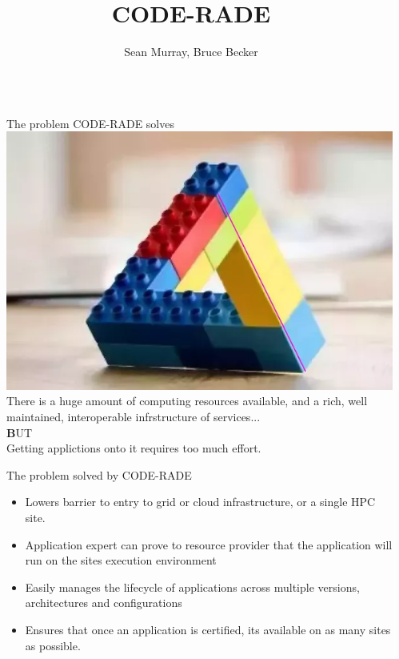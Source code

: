 \documentclass[final]{beamer}
\title{CODE-RADE}
\author{Sean Murray, Bruce Becker}
\institute{CSIR Meraka, University of Cape Town}
\newlength{\sepwid}
\newlength{\onecolwid}
\begin{document}
\begin{frame}[t]
  \begin{columns}[t]												%
    \begin{column}{\sepwid}\end{column}			%
    \begin{column}{\onecolwid}
        \begin{block}{The problem CODE-RADE solves}
             \\
             \center\includegraphics[scale=.5]{img/legoparadox.png}\\
             There is a huge amount of computing resources available, and a rich, well maintained, interoperable infrstructure of services... \\
             \center\textbf BUT \\
             Getting applictions onto it requires too much effort.
        \end{block}         
            \begin{block}{The problem solved by CODE-RADE}
             \begin{itemize}
                 \item Lowers barrier to entry to grid or cloud infrastructure, or a single HPC site.
                 \item Application expert can prove to resource provider that the application will run on the sites execution environment
                 \item Easily manages the lifecycle of applications across multiple versions, architectures and configurations
                 \item Ensures that once an application is certified, its available on as many sites as possible.

\end{itemize}
\end{block}
\end{column}
\end{columns}
\end{frame}
\end{document}
